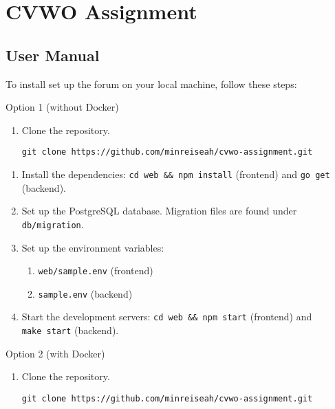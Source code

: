 \documentclass[12pt]{exam}
\begin{document}
\hypertarget{cvwo-assignment}{%
\section{CVWO Assignment}\label{cvwo-assignment}}

\subsection{User Manual}

To install set up the forum on your local machine, follow these steps:

Option 1 (without Docker)

\begin{enumerate}
\def\labelenumi{\arabic{enumi}.}
\item
  Clone the repository. 
  
  \texttt{git\ clone\ https://github.com/minreiseah/cvwo-assignment.git}
\end{enumerate}


\begin{enumerate}
\def\labelenumi{\arabic{enumi}.}
\setcounter{enumi}{1}
\item
  Install the dependencies: \texttt{cd\ web\ \&\&\ npm\ install}
  (frontend) and \texttt{go\ get} (backend).
\item
  Set up the PostgreSQL database. Migration files are found under
  \texttt{db/migration}.
\item
  Set up the environment variables:

  \begin{enumerate}
  \def\labelenumii{\arabic{enumii}.}
  \item
    \texttt{web/sample.env} (frontend)
  \item
    \texttt{sample.env} (backend)
  \end{enumerate}
\item
  Start the development servers: \texttt{cd\ web\ \&\&\ npm\ start}
  (frontend) and \texttt{make\ start} (backend).\\
\end{enumerate} 

Option 2 (with Docker)

\begin{enumerate}
\def\labelenumi{\arabic{enumi}.}
\item
  Clone the repository.

\texttt{git\ clone\ https://github.com/minreiseah/cvwo-assignment.git}
\end{enumerate}
\end{document}
